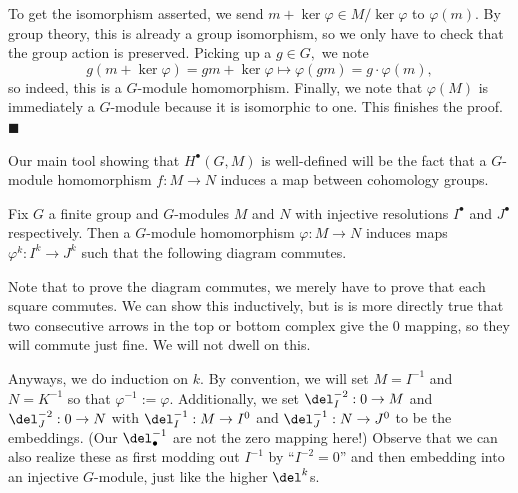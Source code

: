 To get the isomorphism asserted, we send $m+\ker\varphi\in M/\ker\varphi$ to $\varphi(m).$ By group theory, this is already a group isomorphism, so we only have to check that the group action is preserved. Picking up a $g\in G,$ we note
\[g(m+\ker\varphi)=gm+\ker\varphi\mapsto\varphi(gm)=g\cdot\varphi(m),\]
so indeed, this is a $G$-module homomorphism. Finally, we note that $\varphi(M)$ is immediately a $G$-module because it is isomorphic to one. This finishes the proof. $\blacksquare$

Our main tool showing that $H^\bullet(G,M)$ is well-defined will be the fact that a $G$-module homomorphism $f:M\to N$ induces a map between cohomology groups.
\begin{lemma}
    Fix $G$ a finite group and $G$-modules $M$ and $N$ with injective resolutions $I^\bullet$ and $J^\bullet$ respectively. Then a $G$-module homomorphism $\varphi:M\to N$ induces maps $\varphi^k:I^k\to J^k$ such that the following diagram commutes.
    \begin{center}
    \end{center}
\end{lemma}
Note that to prove the diagram commutes, we merely have to prove that each square commutes. We can show this inductively, but is is more directly true that two consecutive arrows in the top or bottom complex give the $0$ mapping, so they will commute just fine. We will not dwell on this.

Anyways, we do induction on $k.$ By convention, we will set $M=I^{-1}$ and $N=K^{-1}$ so that $\varphi^{-1}:=\varphi.$ Additionally, we set $\del_I^{-2}:0\to M$ and $\del_J^{-2}:0\to N$ with $\del_I^{-1}:M\to I^0$ and $\del_J^{-1}:N\to J^0$ to be the embeddings. (Our $\del_\bullet^{-1}$ are not the zero mapping here!) Observe that we can also realize these as first modding out $I^{-1}$ by ``$I^{-2}=0$'' and then embedding into an injective $G$-module, just like the higher $\del^k$s.

